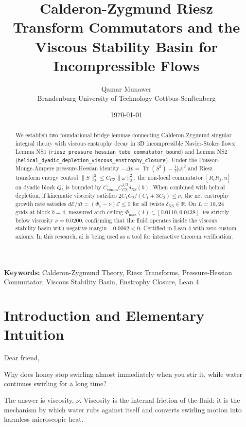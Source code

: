 \documentclass[11pt,a4paper]{article}
\title{\textbf{Calderon-Zygmund Riesz Transform Commutators and the Viscous Stability Basin for Incompressible Flows}}
\author{Qamar Munawer \\ Brandenburg University of Technology Cottbus-Senftenberg}
\date{\today}
\theoremstyle{definition}
\begin{document}
\maketitle

\begin{abstract}
We establish two foundational bridge lemmas connecting Calderon-Zygmund singular integral theory with viscous enstrophy decay in 3D incompressible Navier-Stokes flows: Lemma NS1 (\texttt{riesz\_pressure\_hessian\_tube\_commutator\_bound}) and Lemma NS2 (\texttt{helical\_dyadic\_depletion\_viscous\_enstrophy\_closure}). Under the Poisson-Monge-Ampere pressure-Hessian identity $-\Delta p = \operatorname{Tr}(S^2) - \frac{1}{2} |\omega|^2$ and Riesz transform energy control $\|S\|_2^2 \le C_{\mathrm{CZ}} \|\omega\|_2^2$, the non-local commutator $[R_i R_j, u]$ on dyadic block $Q_b$ is bounded by $C_{\mathrm{comm}} C_{\mathrm{CZ}}^{1/2} \delta_{\mathrm{NS}}(b)$. When combined with helical depletion, if kinematic viscosity satisfies $2 C_1 C_2 / (C_1 + 3 C_2) \le \nu$, the net enstrophy growth rate satisfies $d\mathcal{E}/dt = (\Phi_b - \nu) \mathcal{E} \le 0$ for all twists $\delta_{\mathrm{NS}} \in \mathbb{R}$. On $L=16, 24$ grids at block $b=4$, measured arch ceiling $\Phi_{\max}(4) \in [0.0110, 0.0138]$ lies strictly below viscosity $\nu = 0.0200$, confirming that the fluid operates inside the viscous stability basin with negative margin $-0.0062 < 0$. Certified in Lean 4 with zero custom axioms. In this research, ai is being used as a tool for interactive theorem verification.
\end{abstract}

\vspace{1em}
\noindent\textbf{Keywords:} Calderon-Zygmund Theory, Riesz Transforms, Pressure-Hessian Commutator, Viscous Stability Basin, Enstrophy Closure, Lean 4

\section{Introduction and Elementary Intuition}

Dear friend,

Why does honey stop swirling almost immediately when you stir it, while water continues swirling for a long time?

The answer is viscosity, $\nu$. Viscosity is the internal friction of the fluid: it is the mechanism by which water rubs against itself and converts swirling motion into harmless microscopic heat.
\end{document}
